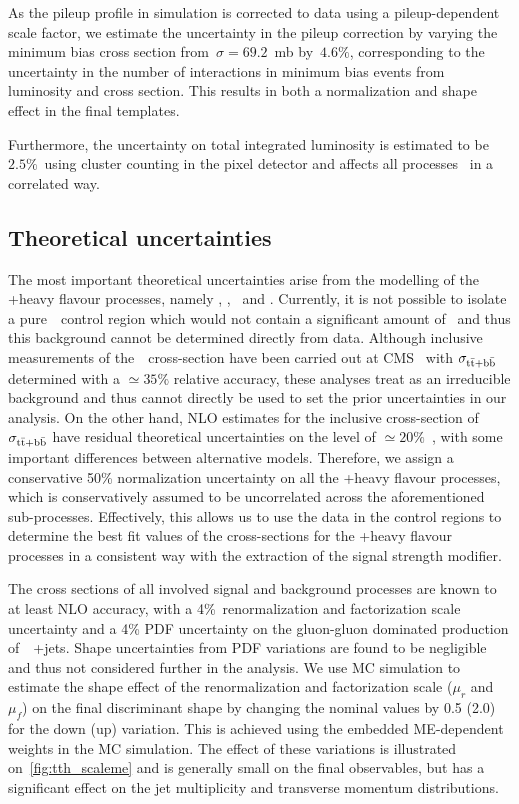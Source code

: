 As the pileup profile in simulation is corrected to data using a pileup-dependent scale factor, we estimate the uncertainty in the pileup correction by varying the minimum bias cross section from~$\sigma = 69.2$~mb by~$4.6\%$, corresponding to the uncertainty in the number of interactions in minimum bias events from luminosity and cross section\cite{CMS:2017_pu_weight_twiki}. This results in both a normalization and shape effect in the final templates.

Furthermore, the uncertainty on total integrated luminosity is estimated to be~$2.5\%$~using cluster counting in the pixel detector and affects all processes~\cite{CMS:2017sdi,CMS:2017_lumi} in a correlated way.

\subsection{Theoretical uncertainties}
\label{sec:theory_unc}
The most important theoretical uncertainties arise from the modelling of the \ttbar+heavy flavour processes, namely \ttbb, \tttwob, \ttb~and \ttcc. Currently, it is not possible to isolate a pure~\ttbb~control region which would not contain a significant amount of~\ttHbb\xspace and thus this background cannot be determined directly from data. Although inclusive measurements of the~\ttbb~cross-section have been carried out at CMS~\cite{Sirunyan:2017snr} with $\sigma_{\mathrm{t} \bar{\mathrm{t}} + \mathrm{b}\bar{\mathrm{b}}}$ determined with a $\simeq 35\%$ relative accuracy, these analyses treat \ttHbb\xspace as an irreducible background and thus cannot directly be used to set the prior uncertainties in our analysis. On the other hand, NLO estimates for the inclusive cross-section of $\sigma_{\mathrm{t} \bar{\mathrm{t}} + \mathrm{b}\bar{\mathrm{b}}}$ have residual theoretical uncertainties on the level of $\simeq 20\%$~\cite{Bredenstein:2010rs}, with some important differences between alternative models. Therefore, we assign a conservative 50\% normalization uncertainty on all the \ttbar+heavy flavour processes, which is conservatively assumed to be uncorrelated across the aforementioned sub-processes. Effectively, this allows us to use the data in the control regions to determine the best fit values of the cross-sections for the \ttbar+heavy flavour processes in a consistent way with the extraction of the signal strength modifier.

The cross sections of all involved signal and background processes are known to at least NLO accuracy, with a 4\%~renormalization and factorization scale uncertainty and a 4\% PDF uncertainty on the gluon-gluon dominated production of~\ttbar~+jets. Shape uncertainties from PDF variations are found to be negligible and thus not considered further in the analysis. We use MC simulation to estimate the shape effect of the renormalization and factorization scale ($\mu_r$ and $\mu_f$) on the final discriminant shape by changing the nominal values by 0.5 (2.0) for the down (up) variation. This is achieved using the embedded ME-dependent weights in the MC simulation. The effect of these variations is illustrated on~\cref{fig:tth_scaleme} and is generally small on the final observables, but has a significant effect on the jet multiplicity and transverse momentum distributions.

